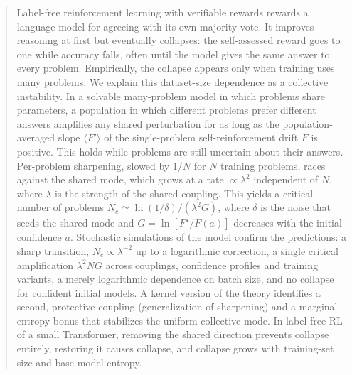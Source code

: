 \begin{abstract}
Label-free reinforcement learning with verifiable rewards rewards a language model for agreeing with its own majority vote. It improves reasoning at first but eventually collapses: the self-assessed reward goes to one while accuracy falls, often until the model gives the same answer to every problem. Empirically, the collapse appears only when training uses many problems.
We explain this dataset-size dependence as a collective instability.
In a solvable many-problem model in which problems share parameters, a population in which different problems prefer different answers amplifies any shared perturbation for as long as the population-averaged slope $\langle F'\rangle$ of the single-problem self-reinforcement drift $F$ is positive. This holds while problems are still uncertain about their answers.
Per-problem sharpening, slowed by $1/N$ for $N$ training problems, races against the shared mode, which grows at a rate $\propto\lambda^2$ independent of $N$, where $\lambda$ is the strength of the shared coupling. This yields a critical number of problems $N_c\simeq\ln(1/\delta)/(\lambda^2G)$, where $\delta$ is the noise that seeds the shared mode and $G=\ln[F^\star/F(a)]$ decreases with the initial confidence $a$.
Stochastic simulations of the model confirm the predictions: a sharp transition, $N_c\propto\lambda^{-2}$ up to a logarithmic correction, a single critical amplification $\lambda^2NG$ across couplings, confidence profiles and training variants, a merely logarithmic dependence on batch size, and no collapse for confident initial models.
A kernel version of the theory identifies a second, protective coupling (generalization of sharpening) and a marginal-entropy bonus that stabilizes the uniform collective mode.
In label-free RL of a small Transformer, removing the shared direction prevents collapse entirely, restoring it causes collapse, and collapse grows with training-set size and base-model entropy.
\end{abstract}
